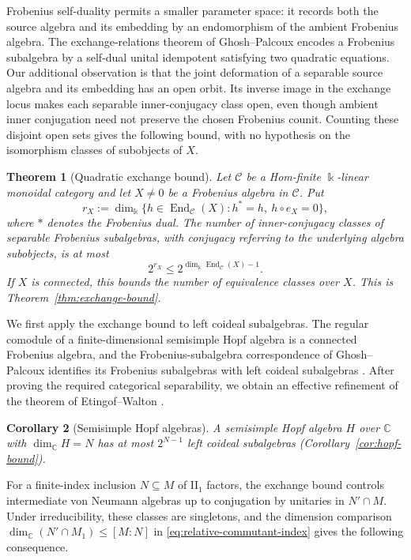 \documentclass[11pt]{amsart}
\newtheorem{theorem}{Theorem}[section]
\newtheorem{corollary}[theorem]{Corollary}
\theoremstyle{definition}
\theoremstyle{remark}
\newcommand{\C}{\mathcal C}
\newcommand{\CC}{\mathbb C}
\newcommand{\kk}{\Bbbk}
\DeclareMathOperator{\End}{End}
\begin{document}
Frobenius self-duality permits a smaller parameter space: it records
both the source algebra and its embedding by an endomorphism of the
ambient Frobenius algebra.  The exchange-relations theorem of
Ghosh--Palcoux \cite[Theorem~4.1]{GhoshPalcouxExchange} encodes a
Frobenius subalgebra by a self-dual unital idempotent satisfying two
quadratic equations.  Our additional observation is that the joint
deformation of a separable source algebra and its embedding has an open
orbit.  Its inverse image in the exchange locus makes each separable
inner-conjugacy class open, even though ambient inner conjugation need
not preserve the chosen Frobenius counit.  Counting these disjoint open
sets gives the following bound, with no hypothesis on the isomorphism
classes of subobjects of $X$.

\begin{theorem}[Quadratic exchange bound]\label{thm:intro-exchange}
Let $\C$ be a Hom-finite $\kk$-linear monoidal category and let $X\ne0$
be a Frobenius algebra in $\C$.  Put
\[
 r_X:=\dim_{\kk}\{h\in\End_{\C}(X):h^*=h,\ h\circ e_X=0\},
\]
where $*$ denotes the Frobenius dual.  The number of inner-conjugacy
classes of separable Frobenius subalgebras, with conjugacy referring to
the underlying algebra subobjects, is at most
\[
 2^{r_X}\leq2^{\dim_{\kk}\End_{\C}(X)-1}.
\]
If $X$ is connected, this bounds the number of equivalence classes over
$X$.  This is Theorem~\ref{thm:exchange-bound}.
\end{theorem}

We first apply the exchange bound to left coideal subalgebras.  The regular
comodule of a
finite-dimensional semisimple Hopf algebra is a connected Frobenius algebra,
and the Frobenius-subalgebra correspondence of Ghosh--Palcoux identifies its
Frobenius subalgebras with left coideal subalgebras
\cite[Theorem~11.11]{GhoshPalcouxLattices}.  After proving the required
categorical separability, we obtain an effective refinement of the theorem
of Etingof--Walton \cite[Theorem~3.6]{EtingofWalton}.

\begin{corollary}[Semisimple Hopf algebras]\label{cor:intro-hopf}
A semisimple Hopf algebra $H$ over $\CC$ with $\dim_{\CC}H=N$ has at most
$2^{N-1}$ left coideal subalgebras
\textup{(Corollary~\ref{cor:hopf-bound})}.
\end{corollary}

For a finite-index inclusion $N\subseteq M$ of $\mathrm{II}_1$ factors,
the exchange bound controls intermediate von Neumann algebras up to
conjugation by unitaries in $N'\cap M$.  Under irreducibility, these
classes are singletons, and the dimension comparison
$\dim_{\CC}(N'\cap M_1)\leq[M:N]$
in \eqref{eq:relative-commutant-index} gives the following consequence.
\end{document}
